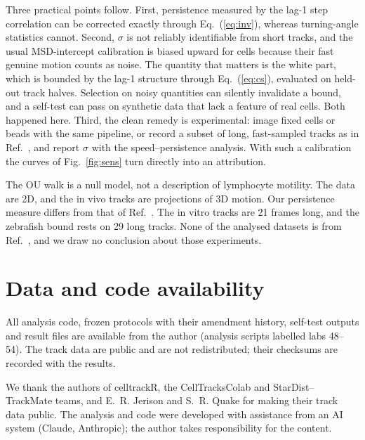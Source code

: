 \documentclass[aps,pre,10pt,twocolumn,superscriptaddress,amsmath,amssymb,floatfix]{revtex4-2}
\begin{document}
Three practical points follow. First, persistence measured by the lag-1 step correlation can be corrected exactly through Eq.~(\ref{eq:inv}), whereas turning-angle statistics cannot. Second, $\sigma$ is not reliably identifiable from short tracks, and the usual MSD-intercept calibration is biased upward for cells because their fast genuine motion counts as noise. The quantity that matters is the white part, which is bounded by the lag-1 structure through Eq.~(\ref{eq:cs}), evaluated on held-out track halves. Selection on noisy quantities can silently invalidate a bound, and a self-test can pass on synthetic data that lack a feature of real cells. Both happened here. Third, the clean remedy is experimental: image fixed cells or beads with the same pipeline, or record a subset of long, fast-sampled tracks as in Ref.~\cite{Jerison2020}, and report $\sigma$ with the speed--persistence analysis. With such a calibration the curves of Fig.~\ref{fig:sens} turn directly into an attribution.

The OU walk is a null model, not a description of lymphocyte motility. The data are 2D, and the in vivo tracks are projections of 3D motion. Our persistence measure differs from that of Ref.~\cite{Maiuri2015}. The in vitro tracks are 21 frames long, and the zebrafish bound rests on 29 long tracks. None of the analysed datasets is from Ref.~\cite{Maiuri2015}, and we draw no conclusion about those experiments.

\section*{Data and code availability}

All analysis code, frozen protocols with their amendment history, self-test outputs and result files are available from the author (analysis scripts labelled labs 48--54). The track data are public \cite{Wortel2021,ZenodoTcell2023,Jerison2020} and are not redistributed; their checksums are recorded with the results.

\begin{acknowledgments}
We thank the authors of celltrackR, the CellTracksColab and StarDist--TrackMate teams, and E.~R. Jerison and S.~R. Quake for making their track data public. The analysis and code were developed with assistance from an AI system (Claude, Anthropic); the author takes responsibility for the content.
\end{acknowledgments}
\end{document}
